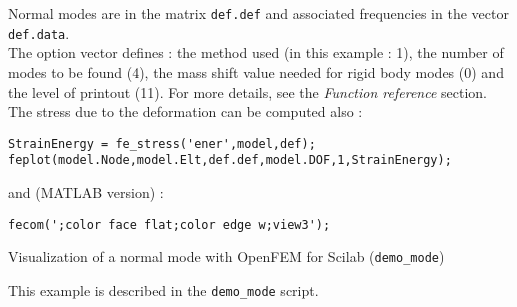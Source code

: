 Normal modes are in the matrix {\tt def.def} and associated frequencies in the vector {\tt def.data}. \\
The option vector defines : the method used (in this example : 1), the number of modes to be found (4), the mass shift value needed for rigid body modes (0) and the level of printout (11). For more details, see the {\sl Function reference} section.\\
The stress due to the deformation can be computed also :\\

\begin{verbatim}
StrainEnergy = fe_stress('ener',model,def);
feplot(model.Node,model.Elt,def.def,model.DOF,1,StrainEnergy);
\end{verbatim}
and (MATLAB version) :
\begin{verbatim}
fecom(';color face flat;color edge w;view3');
\end{verbatim}

\begin{center}
\begin{figure}[H]
\centering
{} %
\end{figure}

Visualization of a normal mode with OpenFEM for Scilab ({\tt demo\_mode})
\end{center}
This example is described in the {\tt demo\_mode} script.


